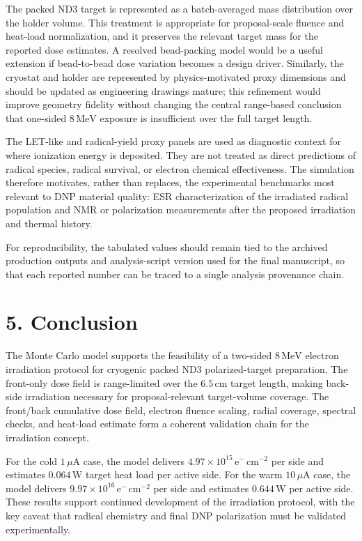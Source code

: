 \documentclass[
  12pt,
]{article}
\begin{document}
The packed ND3 target is represented as a batch-averaged mass
distribution over the holder volume. This treatment is appropriate for
proposal-scale fluence and heat-load normalization, and it preserves the
relevant target mass for the reported dose estimates. A resolved
bead-packing model would be a useful extension if bead-to-bead dose
variation becomes a design driver. Similarly, the cryostat and holder
are represented by physics-motivated proxy dimensions and should be
updated as engineering drawings mature; this refinement would improve
geometry fidelity without changing the central range-based conclusion
that one-sided \(8\,\mathrm{MeV}\) exposure is insufficient over the
full target length.

The LET-like and radical-yield proxy panels are used as diagnostic
context for where ionization energy is deposited. They are not treated
as direct predictions of radical species, radical survival, or electron
chemical effectiveness. The simulation therefore motivates, rather than
replaces, the experimental benchmarks most relevant to DNP material
quality: ESR characterization of the irradiated radical population and
NMR or polarization measurements after the proposed irradiation and
thermal history.

For reproducibility, the tabulated values should remain tied to the
archived production outputs and analysis-script version used for the
final manuscript, so that each reported number can be traced to a single
analysis provenance chain.

\hypertarget{conclusion}{%
\section{5. Conclusion}\label{conclusion}}

The Monte Carlo model supports the feasibility of a two-sided
\(8\,\mathrm{MeV}\) electron irradiation protocol for cryogenic packed
ND3 polarized-target preparation. The front-only dose field is
range-limited over the \(6.5\,\mathrm{cm}\) target length, making
back-side irradiation necessary for proposal-relevant target-volume
coverage. The front/back cumulative dose field, electron fluence
scaling, radial coverage, spectral checks, and heat-load estimate form a
coherent validation chain for the irradiation concept.

For the cold \(1\,\mu\mathrm{A}\) case, the model delivers
\(4.97 \times 10^{15}\,\mathrm{e}^{-}\,\mathrm{cm}^{-2}\) per side and
estimates \(0.064\,\mathrm{W}\) target heat load per active side. For
the warm \(10\,\mu\mathrm{A}\) case, the model delivers
\(9.97 \times 10^{16}\,\mathrm{e}^{-}\,\mathrm{cm}^{-2}\) per side and
estimates \(0.644\,\mathrm{W}\) per active side. These results support
continued development of the irradiation protocol, with the key caveat
that radical chemistry and final DNP polarization must be validated
experimentally.
\end{document}
